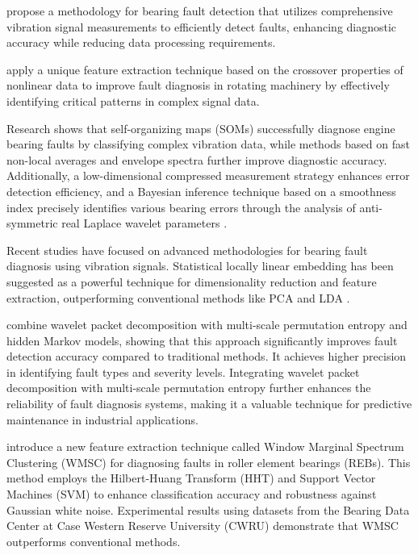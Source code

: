 \documentclass[sn-basic,pdflatex]{sn-jnl}
\theoremstyle{remark}
\theoremstyle{definition}
\begin{document}
\citet{WOS:000335959500009} propose a methodology for bearing fault
detection that utilizes comprehensive vibration signal measurements to
efficiently detect faults, enhancing diagnostic accuracy while reducing
data processing requirements.

\citet{WOS:000338603900013} apply a unique feature extraction technique
based on the crossover properties of nonlinear data to improve fault
diagnosis in rotating machinery by effectively identifying critical
patterns in complex signal data.

Research shows that self-organizing maps (SOMs) successfully diagnose
engine bearing faults by classifying complex vibration data, while
methods based on fast non-local averages and envelope spectra further
improve diagnostic accuracy. Additionally, a low-dimensional compressed
measurement strategy enhances error detection efficiency, and a Bayesian
inference technique based on a smoothness index precisely identifies
various bearing errors through the analysis of anti-symmetric real
Laplace wavelet parameters
\citep{WOS:000380543400119, WOS:000348309400067, WOS:000354607100016, WOS:000350998800016}.

Recent studies have focused on advanced methodologies for bearing fault
diagnosis using vibration signals. Statistical locally linear embedding
has been suggested as a powerful technique for dimensionality reduction
and feature extraction, outperforming conventional methods like PCA and
LDA \citep{WOS:000361788200068}.

\citet{WOS:000362513400031} combine wavelet packet decomposition with
multi-scale permutation entropy and hidden Markov models, showing that
this approach significantly improves fault detection accuracy compared
to traditional methods. It achieves higher precision in identifying
fault types and severity levels. Integrating wavelet packet
decomposition with multi-scale permutation entropy further enhances the
reliability of fault diagnosis systems, making it a valuable technique
for predictive maintenance in industrial applications.

\citet{WOS:000365686400021} introduce a new feature extraction technique
called Window Marginal Spectrum Clustering (WMSC) for diagnosing faults
in roller element bearings (REBs). This method employs the Hilbert-Huang
Transform (HHT) and Support Vector Machines (SVM) to enhance
classification accuracy and robustness against Gaussian white noise.
Experimental results using datasets from the Bearing Data Center at Case
Western Reserve University (CWRU) demonstrate that WMSC outperforms
conventional methods.
\end{document}
